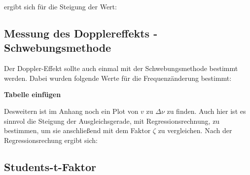 \documentclass[parskip=half]{scrartcl} %
\begin{document}
ergibt sich für die Steigung der Wert:



\subsection{Messung des Dopplereffekts - Schwebungsmethode}
Der Doppler-Effekt sollte auch einmal mit der Schwebungsmethode 
bestimmt werden.
Dabei wurden folgende Werte für die Frequenzänderung 
bestimmt:

\textbf{Tabelle einfügen}

Desweitern ist im Anhang noch ein Plot von $v$ zu $\Delta \nu$ 
zu finden. Auch hier ist es sinnvol die Steigung der Ausgleichsgerade, mit 
Regressionsrechnung, zu bestimmen, um sie anschließend mit dem 
Faktor $\zeta$ zu vergleichen.
Nach der Regressionsrechung ergibt sich:

\subsection{Students-t-Faktor}
\printbibliography
\printindex
\end{document}

